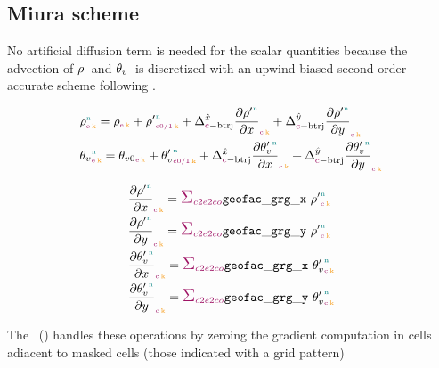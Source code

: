 \clearpage
\subsection{Miura scheme}
\label{sub:miura}
%
No artificial diffusion term is needed for the scalar quantities because the advection of $\density{}{}{}$ and $\vpotemp{}{}{}$ is discretized with an upwind-biased second-order accurate scheme following \cite{miuraUpwindBiasedConservativeAdvection2007}.

\begin{align}
  &\density{\n}{\e}{\k} = \densityref{\e}{\k} + \densityprime{\n}{\c 0/1}{\k} + \Delta^{\hat{x}}_{\c - \text{btrj}} \densityprimedx{\n}{\c}{\k} + \Delta^{\hat{y}}_{\c - \text{btrj}} \densityprimedy{\n}{\c}{\k} \\
  &\vpotemp{\n}{\e}{\k} = \vpotempref{\e}{\k} + \vpotempprime{\n}{\c 0/1}{\k} + \Delta^{\hat{x}}_{\c - \text{btrj}} \vpotempprimedx{\n}{\c}{\k} + \Delta^{\hat{y}}_{\c - \text{btrj}} \vpotempprimedy{\n}{\c}{\k}
\end{align}

\begin{align}
  & \densityprimedx{\n}{\c}{\k} = \sum_{\offProv{c2e2co}} \geofacgrgx\ \densityprime{\n}{\c}{\k} \\
  & \densityprimedy{\n}{\c}{\k} = \sum_{\offProv{c2e2co}} \geofacgrgy\ \densityprime{\n}{\c}{\k} \\
  & \vpotempprimedx{\n}{\c}{\k} = \sum_{\offProv{c2e2co}} \geofacgrgx\ \vpotempprime{\n}{\c}{\k} \\
  & \vpotempprimedy{\n}{\c}{\k} = \sum_{\offProv{c2e2co}} \geofacgrgy\ \vpotempprime{\n}{\c}{\k}
\end{align}

The \ibm\ (\IBM) handles these operations by zeroing the gradient computation in cells adiacent to masked cells (\ie those indicated with a grid pattern)

